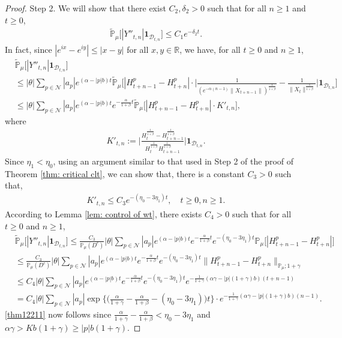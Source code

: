 \documentclass[12pt,a4paper]{amsart}
\theoremstyle{plain}
\theoremstyle{definition}
\numberwithin{equation}{section}
\begin{document}
\begin{proof}
    Step 2.
    We will show that there exist $C_2,\delta_2 > 0$ such that for all $n\geq 1$ and $t\geq 0$,
\begin{align}
\label{thm12211}
    \mathbb{\widetilde{P}}_{\mu}\big[|Y''_{t,n}|\mathbf{1}_{\mathcal{D}_{t,n}}\big]\leq C_1e^{-\delta_2 t}.
\end{align}
    In fact, since $|e^{ix}-e^{iy}|\leq|x-y|$ for all $x,y\in \mathbb R$, we have, for all $t \geq 0$ and $n\geq 1$,
\begin{align}\label{large: used next}
    &\widetilde{\mathbb{P}}_{\mu}\big[|Y''_{t,n}|\mathbf{1}_{\mathcal{D}_{t,n}}\big]\\
    &\leq |\theta|\sum_{p\in\mathcal{N}}|a_p|e^{(\alpha-|p|b)t}\widetilde{\mathbb{P}}_{\mu}\Big[|H_{t+n-1}^p-H_{t+n}^p|\cdot\Big|\frac{1}{(e^{-\alpha(n-1)}\|X_{t+n-1}\|)^{\frac{1}{1+\beta}}}-\frac{1}{\|X_t\|^{\frac{1}{1+\beta}}}\Big|\mathbf{1}_{\mathcal{D}_{t,n}}\Big]\\
    &\leq |\theta|\sum_{p\in\mathcal{N}}|a_p|e^{(\alpha-|p|b)t}e^{-\frac{\alpha}{1+\beta}t}\widetilde{\mathbb{P}}_{\mu}\Big[|H_{t+n-1}^p-H_{t+n}^p|\cdot K'_{t,n}\Big],
\end{align}
    where
\begin{align}
    K'_{t,n}
    :=\Big|\frac{H_t^{\frac{1}{1+\beta}}-H_{t+n-1}^{\frac{1}{1+\beta}}}{H_t^{\frac{1}{1+\beta}}H_{t+n-1}^{\frac{1}{1+\beta}}}\Big|\mathbf{1}_{\mathcal{D}_{t,n}}.
\end{align}
	Since $\eta_1 < \eta_0$, using an argument similar to that used in Step 2 of the proof of Theorem \ref{thm: critical clt}, we can show that, there is a constant $C_3> 0$ such that,
\begin{align}
\label{ineq: control of Kkt1}
     K'_{t,n}
     \leq C_3 e^{-(\eta_0 - 3\eta_1) t},
     \quad t \geq 0, n\geq 1.
\end{align}
    According to Lemma \ref{lem: control of wt}, there exists $C_4>0$ such that for all $t\geq 0$ and $n\geq 1$,
\begin{align}\label{ineq:used next 2}
    &\widetilde{\mathbb{P}}_{\mu}\big[|Y''_{t,n}|\mathbf{1}_{\mathcal{D}_{t,n}}\big]
    \leq \frac{C_3}{\mathbb{P}_{\mu}(D^c)} |\theta|\sum_{p\in\mathcal{N}}|a_p|e^{(\alpha-|p|b)t}e^{-\frac{\alpha}{1+\beta}t}e^{-(\eta_0-3\eta_1)t}\mathbb{P}_{\mu}\Big[|H_{t+n-1}^p-H_{t+n}^p|\Big]\\
    &\leq \frac{C_3}{\mathbb{P}_{\mu}(D^c)} |\theta|\sum_{p\in\mathcal{N}}|a_p|e^{(\alpha-|p|b)t}e^{-\frac{\alpha}{1+\beta}t}e^{-(\eta_0-3\eta_1)t}\|H_{t+n-1}^p-H_{t+n}^p\|_{\mathbb{P}_{\mu};1+\gamma}
    \\&\leq C_4|\theta|\sum_{p\in\mathcal{N}}|a_p|e^{(\alpha-|p|b)t}e^{-\frac{\alpha}{1+\beta}t}e^{-(\eta_0-3\eta_1)t}e^{-\frac{1}{1+\gamma}(\alpha\gamma-|p|(1+\gamma)b)(t+n-1)}\\
    &=C_4|\theta|\sum_{p\in\mathcal{N}}|a_p|\exp\Big\{\Big(\frac{\alpha}{1+\gamma}-\frac{\alpha}{1+\beta}-(\eta_0-3\eta_1)\Big)t\Big\}\cdot e^{-\frac{1}{1+\gamma}(\alpha\gamma-|p|(1+\gamma)b)(n-1)}.
\end{align}
    \eqref{thm12211} now follows  since $\frac{\alpha}{1+\gamma}-\frac{\alpha}{1+\beta}<\eta_0-3\eta_1$ and $\alpha\gamma>Kb(1+\gamma)\geq |p|b(1+\gamma)$.


\end{proof}
\end{document}
